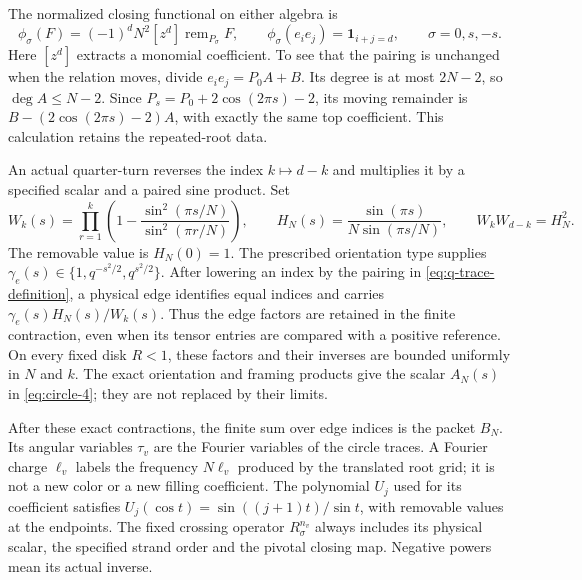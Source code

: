 The normalized closing functional on either algebra is
\begin{equation}\label{eq:q-trace-definition}
 \phi_\sigma(F)=(-1)^dN^2[z^d]\operatorname{rem}_{P_\sigma}F,
 \qquad \phi_\sigma(e_i e_j)=\mathbf1_{i+j=d},
 \qquad \sigma=0,s,-s.
\end{equation}
Here $[z^d]$ extracts a monomial coefficient. To see that the pairing
is unchanged when the relation moves, divide $e_i e_j=P_0A+B$.
Its degree is at most $2N-2$, so $\deg A\le N-2$. Since
$P_s=P_0+2\cos(2\pi s)-2$, its moving remainder is
$B-(2\cos(2\pi s)-2)A$, with exactly the same top coefficient.
This calculation retains the repeated-root data.

An actual quarter-turn reverses the index $k\mapsto d-k$ and
multiplies it by a specified scalar and a paired sine product. Set
\begin{equation}\label{eq:q-paired-definition}
 W_k(s)=\prod_{r=1}^k
       \left(1-\frac{\sin^2(\pi s/N)}{\sin^2(\pi r/N)}\right),
 \qquad H_N(s)=\frac{\sin(\pi s)}{N\sin(\pi s/N)},
 \qquad W_kW_{d-k}=H_N^2.
\end{equation}
The removable value is $H_N(0)=1$. The prescribed orientation type
supplies $\gamma_e(s)\in\{1,q^{-s^2/2},q^{s^2/2}\}$. After lowering
an index by the pairing in \eqref{eq:q-trace-definition}, a physical
edge identifies equal indices and carries
$\gamma_e(s)H_N(s)/W_k(s)$. Thus the edge factors are retained in the
finite contraction, even when its tensor entries are compared with a
positive reference. On every fixed disk $R<1$, these factors and
their inverses are bounded uniformly in $N$ and $k$. The exact
orientation and framing products give the scalar $A_N(s)$ in
\eqref{eq:circle-4}; they are not replaced by their limits.

After these exact contractions, the finite sum over edge indices is the packet
$B_N$. Its angular variables $\tau_v$ are the Fourier variables of the
circle traces. A Fourier charge $\ell_v$ labels the frequency
$N\ell_v$ produced by the translated root grid; it is not a new color
or a new filling coefficient. The polynomial $U_j$ used for its
coefficient satisfies
$U_j(\cos t)=\sin((j+1)t)/\sin t$, with removable values at the endpoints.
The fixed crossing operator $R_\sigma^{n_v}$ always includes its
physical scalar, the specified strand order and the pivotal closing
map. Negative powers mean its actual inverse.


